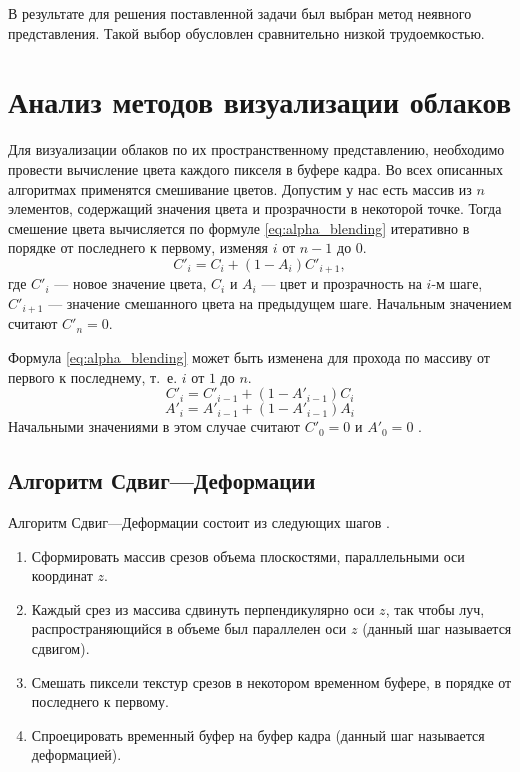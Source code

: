 В результате для решения поставленной задачи был выбран метод неявного представления. Такой выбор обусловлен сравнительно низкой трудоемкостью.


\section{Анализ методов визуализации облаков}

Для визуализации облаков по их пространственному представлению, необходимо провести вычисление цвета каждого пикселя в буфере кадра. Во всех описанных алгоритмах применятся смешивание цветов. Допустим у нас есть массив из $n$ элементов, содержащий значения цвета и прозрачности в некоторой точке. Тогда смешение цвета вычисляется по формуле \eqref{eq:alpha_blending} итеративно в порядке от последнего к первому, изменяя $i$ от $n-1$ до $0$.
\begin{equation}
	\label{eq:alpha_blending}
	C'_i = C_i + (1 - A_i)C'_{i+1},
\end{equation}
где $C'_i$ --- новое значение цвета, $C_i$ и $A_i$ --- цвет и прозрачность на $i$-м шаге, $C'_{i+1}$ --- значение смешанного цвета на предыдущем шаге. Начальным значением считают $C'_n = 0$.

Формула \eqref{eq:alpha_blending} может быть изменена для прохода по массиву от первого к последнему, т.~е. $i$ от $1$ до $n$.
\begin{equation}
	\label{eq:color_blending_for}
	C'_i = C'_{i - 1} + (1 - A'_{i - 1})C_{i}
\end{equation}
\begin{equation}
	\label{eq:alpha_blending_for}
	A'_i = A'_{i - 1} + (1 - A'_{i - 1})A_{i}
\end{equation}
Начальными значениями в этом случае считают $C'_0 = 0$ и $A'_0=0$ \cite{rtvg}.


\subsection{Алгоритм Сдвиг---Деформации}
\label{slice}

Алгоритм Сдвиг---Деформации состоит из следующих шагов \cite{shearwarp}.

\begin{enumerate}
	\item Сформировать массив срезов объема плоскостями, параллельными оси координат $z$.
	\item Каждый срез из массива сдвинуть перпендикулярно оси $z$, так чтобы луч, распространяющийся в объеме был параллелен оси $z$ (данный шаг называется сдвигом). 
	\item Смешать пиксели текстур срезов в некотором временном буфере, в порядке от последнего к первому.
	\item Спроецировать временный буфер на буфер кадра (данный шаг называется деформацией).
\end{enumerate}


